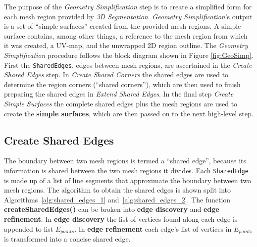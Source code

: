 The purpose of the \textit{Geometry Simplification} step is to create a simplified form for each mesh region provided by \textit{3D Segmentation}.
\textit{Geometry Simplification}'s output is a set of ``simple surfaces'' created from the provided mesh regions.
A simple surface contains, among other things, a reference to the mesh region from which it was created, a UV-map, and the unwrapped 2D region outline.
The \textit{Geometry Simplification} procedure follows the block diagram shown in Figure \ref{fig:GeoSimp}.
First the \verb|SharedEdges|, edges between mesh regions, are ascertained in the \textit{Create Shared Edges} step.
In \textit{Create Shared Corners} the shared edges are used to determine the region corners (``shared corners''), which are then used to finish preparing the shared edges in \textit{Extend Shared Edges}.
In the final step \textit{Create Simple Surfaces} the complete shared edges plus the mesh regions are used to create the \textbf{simple surfaces}, which are then passed on to the next high-level step.

\subsection{Create Shared Edges}
The boundary between two mesh regions is termed a ``shared edge'', because its information is shared between the two mesh regions it divides.
Each \verb|SharedEdge| is made up of a list of line segments that approximate the boundary between two mesh regions.
The algorithm to obtain the shared edges is shown split into Algorithms~\ref{alg:shared_edges_1} and~\ref{alg:shared_edges_2}.
The function \textbf{createSharedEdges()} can be broken into \textbf{edge discovery} and \textbf{edge refinement}.
In \textbf{edge discovery} the list of vertices found along each edge is appended to list $E_{points}$.
In \textbf{edge refinement} each edge's list of vertices in $E_{points}$ is transformed into a concise shared edge.

